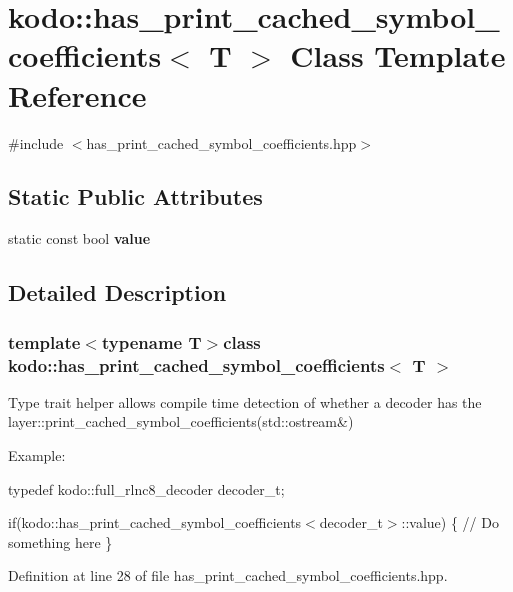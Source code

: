 \hypertarget{classkodo_1_1has__print__cached__symbol__coefficients}{\section{kodo\-:\-:has\-\_\-print\-\_\-cached\-\_\-symbol\-\_\-coefficients$<$ T $>$ Class Template Reference}
\label{classkodo_1_1has__print__cached__symbol__coefficients}
}


{\ttfamily \#include $<$has\-\_\-print\-\_\-cached\-\_\-symbol\-\_\-coefficients.\-hpp$>$}

\subsection*{Static Public Attributes}
\begin{DoxyCompactItemize}
\item 
static const bool {\bfseries value}
\end{DoxyCompactItemize}


\subsection{Detailed Description}
\subsubsection*{template$<$typename T$>$class kodo\-::has\-\_\-print\-\_\-cached\-\_\-symbol\-\_\-coefficients$<$ T $>$}

Type trait helper allows compile time detection of whether a decoder has the layer\-::print\-\_\-cached\-\_\-symbol\-\_\-coefficients(std\-::ostream\&)

Example\-:

typedef kodo\-::full\-\_\-rlnc8\-\_\-decoder decoder\-\_\-t;

if(kodo\-::has\-\_\-print\-\_\-cached\-\_\-symbol\-\_\-coefficients$<$decoder\-\_\-t$>$\-::value) \{ // Do something here \} 

Definition at line 28 of file has\-\_\-print\-\_\-cached\-\_\-symbol\-\_\-coefficients.\-hpp.




